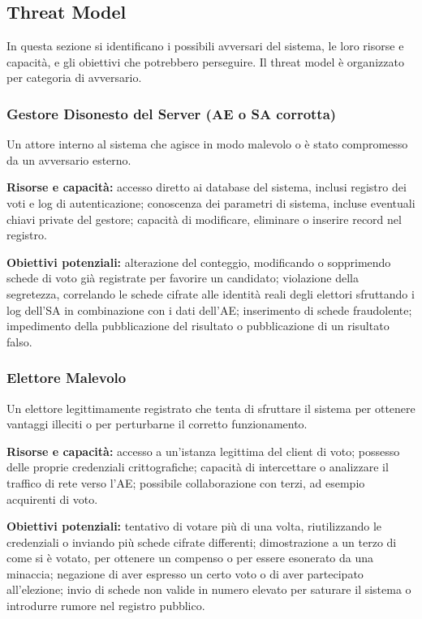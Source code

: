 \documentclass[12pt,a4paper]{article}
\begin{document}
\subsection{Threat Model}

In questa sezione si identificano i possibili avversari del sistema, le loro risorse e
capacità, e gli obiettivi che potrebbero perseguire. Il threat model è organizzato per
categoria di avversario.

\subsubsection{Gestore Disonesto del Server (AE o SA corrotta)}

Un attore interno al sistema che agisce in modo malevolo o è stato compromesso da un avversario
esterno.

\textbf{Risorse e capacità:} accesso diretto ai database del sistema, inclusi registro dei voti
e log di autenticazione; conoscenza dei parametri di sistema, incluse eventuali chiavi private
del gestore; capacità di modificare, eliminare o inserire record nel registro.

\textbf{Obiettivi potenziali:} alterazione del conteggio, modificando o sopprimendo schede di
voto già registrate per favorire un candidato; violazione della segretezza, correlando le
schede cifrate alle identità reali degli elettori sfruttando i log dell'SA in combinazione con
i dati dell'AE; inserimento di schede fraudolente; impedimento della pubblicazione del risultato
o pubblicazione di un risultato falso.

\subsubsection{Elettore Malevolo}

Un elettore legittimamente registrato che tenta di sfruttare il sistema per ottenere vantaggi
illeciti o per perturbarne il corretto funzionamento.

\textbf{Risorse e capacità:} accesso a un'istanza legittima del client di voto; possesso delle
proprie credenziali crittografiche; capacità di intercettare o analizzare il traffico di rete
verso l'AE; possibile collaborazione con terzi, ad esempio acquirenti di voto.

\textbf{Obiettivi potenziali:} tentativo di votare più di una volta, riutilizzando le
credenziali o inviando più schede cifrate differenti; dimostrazione a un terzo di come si è
votato, per ottenere un compenso o per essere esonerato da una minaccia; negazione di aver
espresso un certo voto o di aver partecipato all'elezione; invio di schede non valide in numero
elevato per saturare il sistema o introdurre rumore nel registro pubblico.
\end{document}

